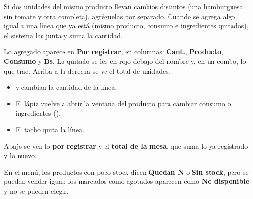 
\begin{consejo}
Si dos unidades del mismo producto llevan cambios distintos (una hamburguesa sin tomate y otra completa), agréguelas por separado. Cuando se agrega algo igual a una línea que ya está (mismo producto, consumo e ingredientes quitados), el sistema las junta y suma la cantidad.
\end{consejo}


Lo agregado aparece en \textbf{Por registrar}, en columnas: \textbf{Cant.}, \textbf{Producto}, \textbf{Consumo} y \textbf{Bs}. Lo quitado se lee en rojo debajo del nombre y, en un combo, lo que trae. Arriba a la derecha se ve el total de unidades.

\begin{itemize}
  \item \menos{} y \mas{} cambian la cantidad de la línea.
  \item El lápiz vuelve a abrir la ventana del producto para cambiar consumo o ingredientes ().
  \item El tacho quita la línea.
\end{itemize}

Abajo se ven lo \textbf{por registrar} y el \textbf{total de la mesa}, que suma lo ya registrado y lo nuevo.

En el menú, los productos con poco stock dicen \textbf{Quedan N} o \textbf{Sin stock}, pero se pueden vender igual; los marcados como agotados aparecen como \textbf{No disponible} y no se pueden elegir.

